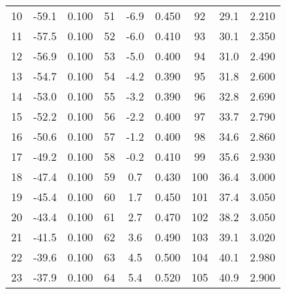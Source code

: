 \begin{table}
\begin{tabular}{c c c@{\hskip 1cm}||@{\hskip 1cm} c c c@{\hskip 1cm} ||@{\hskip 1cm} c c c}
10  &    -59.1    &       0.100   & 51  &    -6.9     &       0.450   &  92  &    29.1     &       2.210  \\                                     
11  &    -57.5    &       0.100   & 52  &    -6.0     &       0.410   &  93  &    30.1     &       2.350  \\                                      
12  &    -56.9    &       0.100   & 53  &    -5.0     &       0.400    &  94  &    31.0     &       2.490  \\                                      
13  &    -54.7    &       0.100   & 54  &    -4.2     &       0.390   &  95  &    31.8     &       2.600   \\                                      
14  &    -53.0    &       0.100   & 55  &    -3.2     &       0.390   &  96  &    32.8     &       2.690  \\                                      
15  &    -52.2    &       0.100   & 56  &    -2.2     &       0.400    &  97  &    33.7     &       2.790  \\                                      
16  &    -50.6    &       0.100   & 57  &    -1.2     &       0.400    &  98  &    34.6     &       2.860  \\                                      
17  &    -49.2    &       0.100   & 58  &    -0.2     &       0.410   &  99  &    35.6     &       2.930  \\                                      
18  &    -47.4    &       0.100   & 59  &    0.7      &       0.430   &  100 &    36.4     &       3.000   \\                                      
19  &    -45.4    &       0.100   & 60  &    1.7      &       0.450   &  101 &    37.4     &       3.050  \\                                      
20  &    -43.4    &       0.100   & 61  &    2.7      &       0.470   &  102 &    38.2     &       3.050  \\                                      
21  &    -41.5    &       0.100   & 62  &    3.6      &       0.490   &  103 &    39.1     &       3.020  \\                                      
22  &    -39.6    &       0.100   & 63  &    4.5      &       0.500   &  104 &    40.1     &       2.980  \\                                      
23  &    -37.9    &       0.100   & 64  &    5.4      &       0.520   &  105 &    40.9     &       2.900  \\                                      

\end{tabular}
\end{table}
